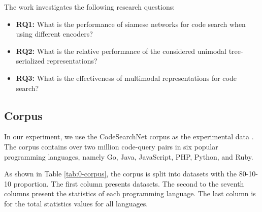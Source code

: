 \documentclass[conference]{IEEEtran}
\begin{document}
The work investigates the following research questions:

\newcommand\rqaaa{What is the performance of siamese networks for code search when using different encoders?}
\newcommand\rqbbb{What is the relative performance of the considered unimodal tree-serialized representations?}
\newcommand\rqccc{What is the effectiveness of multimodal representations for code search?}

\begin{itemize}
  \item \textbf{RQ1:} \rqaaa
  \item \textbf{RQ2:} \rqbbb
  \item \textbf{RQ3:} \rqccc
\end{itemize}

\subsection{Corpus}

In our experiment, we use the CodeSearchNet corpus as the experimental data \cite{Husain2019CodeSearchNetCE}. The corpus contains over two million code-query pairs in six popular programming languages, namely Go, Java, JavaScript, PHP, Python, and Ruby.

As shown in Table \ref{tab:0-corpus}, the corpus is split into datasets with the 80-10-10 proportion. The first column presents datasets. The second to the seventh columns present the statistics of each programming language. The last column is for the total statistics values for all languages.

\begin{table}[thb]
\centering
\caption{Statistics of Code-Query Pairs in the Corpus}
~\\
\label{tab:0-corpus}
\end{table}
 
\end{document}
